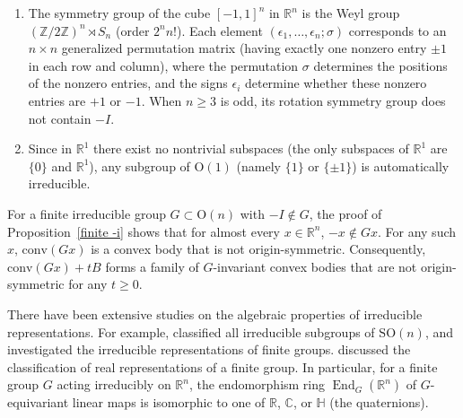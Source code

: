 \documentclass[12pt, reqno]{amsart}
\theoremstyle{definition}
\theoremstyle{remark}
\numberwithin{equation}{section}
\newcommand{\On}{\mathrm{O}(n)}
\newcommand{\SOn}{\mathrm{SO}(n)}
\begin{document}
\begin{enumerate}
		
		
		
		
		\item 	The symmetry group of the cube \([-1, 1]^n\) in \(\mathbb{R}^n\) is the Weyl group $ (\mathbb{Z}/2\mathbb{Z})^n \rtimes S_n$ (order $2^{n}n!$).
			Each element $(\epsilon_1,\ldots,\epsilon_n; \sigma)$ corresponds to an $n \times n$ generalized permutation matrix (having exactly one nonzero entry $\pm 1$ in each row and column), where
			the permutation $\sigma$ determines the positions of the nonzero entries, and
			the signs $\epsilon_i$ determine whether these nonzero entries are $+1$ or $-1$.
			When \(n \geq 3\) is odd, its rotation symmetry group does not contain \(-I\). 
			
			
			
			
		
		
		
		
	
	
		
		\item  Since in $\mathbb{R}^{1}$ there exist no nontrivial subspaces (the only subspaces of $\mathbb{R}^1$ are $\{0\}$ and $\mathbb{R}^1$), any subgroup of $\mathrm{O}(1)$ (namely $\{1\}$ or $\{\pm 1\}$) is automatically irreducible.
	\end{enumerate}
	
	For a finite irreducible group $G\subset \On$ with $-I \notin G$,  the proof of Proposition~\ref{finite -i}  shows that for almost every $x \in \mathbb{R}^n$,  $ -x\notin Gx$. For any such $x$, $\mathrm{conv}(Gx)$ is a convex body that is  not origin-symmetric. Consequently, $\mathrm{conv}(Gx) + tB$ forms a family of $G$-invariant convex bodies that are not origin-symmetric for any $t \geq 0$.
	
	
	There have been extensive studies on the algebraic properties of irreducible representations. For example,
	\cite{Zimmermann} classified all irreducible subgroups of $\SOn$, and \cite{Fulton repre} investigated  the irreducible representations of finite groups. \cite{real repre} discussed  the classification of real representations of a finite
	group. In particular,  for a finite group $G$ acting irreducibly on $\mathbb{R}^n$, the endomorphism ring $\operatorname{End}_G( \mathbb{R}^n) $ of $G$-equivariant linear maps is isomorphic to one of 
	$\mathbb{R}$, $\mathbb{C}$, or $\mathbb{H}$  (the quaternions).
	
\end{document}
